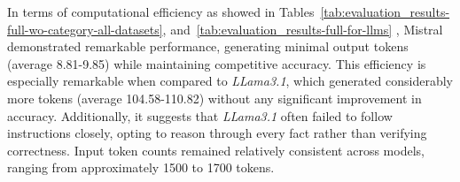\begin{table}[ht!]
    \noindent
    \caption{Statistical analysis of output tokens and request times per query across FactBench, YAGO, and DBpedia datasets for each used model.}
    \label{tab:evaluation_results-full-for-llms}
\end{table}

In terms of computational efficiency as showed in Tables~\ref{tab:evaluation_results-full-wo-category-all-datasets}, and~\ref{tab:evaluation_results-full-for-llms} , Mistral demonstrated remarkable performance, generating minimal output tokens (average 8.81-9.85) while maintaining competitive accuracy.
This efficiency is especially remarkable when compared to \textit{LLama3.1}, which generated considerably more tokens (average 104.58-110.82) without any significant improvement in accuracy.
Additionally, it suggests that \textit{LLama3.1} often failed to follow instructions closely, opting to reason through every fact rather than verifying correctness.
Input token counts remained relatively consistent across models, ranging from approximately 1500 to 1700 tokens.

